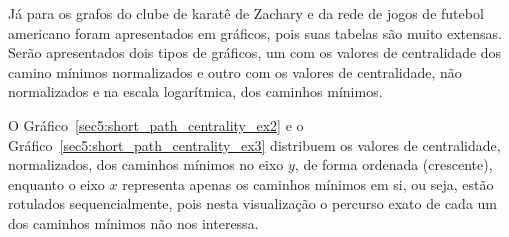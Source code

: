 \begin{table}[!htp]
	\centering
	\caption{Valores de centralidade do grafo simples, Algoritmo~\ref{sec4:funcao_simple_graph_generator}.}
	\label{sec5:centralidade_grafo_teste}
\end{table}

Já para os grafos do clube de karatê de Zachary e da rede de jogos de futebol americano foram apresentados em gráficos, pois suas tabelas são muito extensas. Serão apresentados dois tipos de gráficos, um com os valores de centralidade dos camino mínimos normalizados e outro com os valores de centralidade, não normalizados e na escala logarítmica, dos caminhos mínimos.

O Gráfico~\ref{sec5:short_path_centrality_ex2} e o Gráfico~\ref{sec5:short_path_centrality_ex3} distribuem os valores de centralidade, normalizados, dos caminhos mínimos no eixo $y$, de forma ordenada (crescente), enquanto o eixo $x$ representa apenas os caminhos mínimos em si, ou seja, estão rotulados sequencialmente, pois nesta visualização o percurso exato de cada um dos caminhos mínimos não nos interessa.

